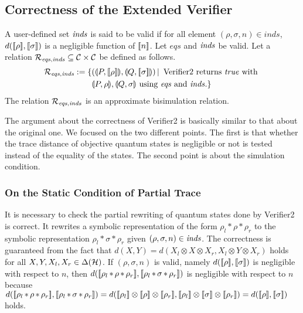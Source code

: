 \subsection{Correctness of the Extended Verifier}
A user-defined set $\mathit{inds}$ is said to be valid if for all
element $(\rho, \sigma, n) \in \mathit{inds}$, $d([\![\rho]\!],
[\![\sigma]\!])$ is a negligible function of $[\![n]\!]$.
Let $\mathit{eqs}$ and $\mathit{inds}$ be valid.
Let a relation $\mathcal{R}_{\mathit{eqs}, \mathit{inds}} \subseteq \mathcal{C} \times \mathcal{C}$ be defined
as follows.
\begin{align*}
 \mathcal{R}_{\mathit{eqs}, \mathit{inds}} :=
 \{&(\llparenthesis P, [\![\rho]\!] \rrparenthesis,
 \llparenthesis Q, [\![\sigma]\!] \rrparenthesis) \,|\,
 \mbox{ Verifier2 returns } \mathit{true}
 \mbox{ with }\\
 & \llparenthesis P, \rho \rrparenthesis, \llparenthesis Q, \sigma \rrparenthesis \mbox{ using } \mathit{eqs}
 \mbox{ and } \mathit{inds}.
\}
\end{align*}
The relation $\mathcal{R}_{\mathit{eqs}, \mathit{inds}}$ is an approximate bisimulation
relation.

The argument about the correctness of Verifier2
is basically similar to that about the original one.
We focused on the two different points. The first is
that whether the trace distance of objective quantum
states is negligible or not is tested instead of the equality of
the states. The second point is about the simulation condition.

\subsubsection{On the Static Condition of Partial Trace}
It is necessary to check the partial rewriting of quantum states
done by Verifier2 is correct. It rewrites a
symbolic representation of the form $\rho_l \, \mathtt{*}\,
 \rho \,\mathtt{*}\, \rho_r$ to
the symbolic representation $\rho_l \, \mathtt{*}\, \sigma
 \,\mathtt{*}\, \rho_r$ given
$(\rho, \sigma, n) \in \mathit{inds}$. 
The correctness is guaranteed from the fact that 
$d(X, Y) = d(X_l \otimes X \otimes X_r,
X_l \otimes Y \otimes X_r)$ holds for all $X, Y, X_l, X_r \in
\Delta(\mathcal{H})$. If $(\rho, \sigma, n)$ is valid, namely 
$d([\![\rho]\!], [\![\sigma]\!])$ is negligible with respect to $n$, 
then $d([\![\rho_l \, \mathtt{*}\,
 \rho \,\mathtt{*}\, \rho_r]\!],
[\![\rho_l \, \mathtt{*}\,
 \sigma \,\mathtt{*}\, \rho_r]\!])$ is negligible
 with respect to $n$ because
$d(\braw{\rho_l \, \mathtt{*}\,
 \rho \,\mathtt{*}\, \rho_r},
\braw{\rho_l \, \mathtt{*}\,
 \sigma \,\mathtt{*}\, \rho_r}) =
d(\braw{\rho_l} \otimes
 \braw{\rho} \otimes \braw{\rho_r},
\braw{\rho_l} \otimes
 \braw{\sigma} \otimes \braw{\rho_r}
)=
d(\braw{\rho},\braw{\sigma})
$ holds.


